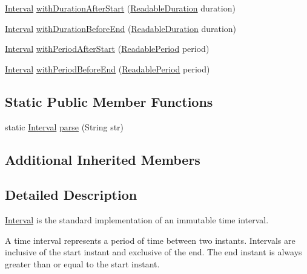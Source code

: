 \begin{DoxyCompactItemize}
\item 
\hyperlink{classorg_1_1joda_1_1time_1_1_interval}{Interval} \hyperlink{classorg_1_1joda_1_1time_1_1_interval_a83520867ffb9dcca610bc0f55a8ce4bc}{with\-Duration\-After\-Start} (\hyperlink{interfaceorg_1_1joda_1_1time_1_1_readable_duration}{Readable\-Duration} duration)
\item 
\hyperlink{classorg_1_1joda_1_1time_1_1_interval}{Interval} \hyperlink{classorg_1_1joda_1_1time_1_1_interval_a9562f709f8c37209b6953010fd20163e}{with\-Duration\-Before\-End} (\hyperlink{interfaceorg_1_1joda_1_1time_1_1_readable_duration}{Readable\-Duration} duration)
\item 
\hyperlink{classorg_1_1joda_1_1time_1_1_interval}{Interval} \hyperlink{classorg_1_1joda_1_1time_1_1_interval_a5d4fe208806243166d655d7a9c057293}{with\-Period\-After\-Start} (\hyperlink{interfaceorg_1_1joda_1_1time_1_1_readable_period}{Readable\-Period} period)
\item 
\hyperlink{classorg_1_1joda_1_1time_1_1_interval}{Interval} \hyperlink{classorg_1_1joda_1_1time_1_1_interval_a33a8552edd85cb98a41e5d963d0cb472}{with\-Period\-Before\-End} (\hyperlink{interfaceorg_1_1joda_1_1time_1_1_readable_period}{Readable\-Period} period)
\end{DoxyCompactItemize}
\subsection*{Static Public Member Functions}
\begin{DoxyCompactItemize}
\item 
static \hyperlink{classorg_1_1joda_1_1time_1_1_interval}{Interval} \hyperlink{classorg_1_1joda_1_1time_1_1_interval_a23af9809540228b44726c3aabc6983d3}{parse} (String str)
\end{DoxyCompactItemize}
\subsection*{Additional Inherited Members}


\subsection{Detailed Description}
\hyperlink{classorg_1_1joda_1_1time_1_1_interval}{Interval} is the standard implementation of an immutable time interval. 

A time interval represents a period of time between two instants. Intervals are inclusive of the start instant and exclusive of the end. The end instant is always greater than or equal to the start instant. 

